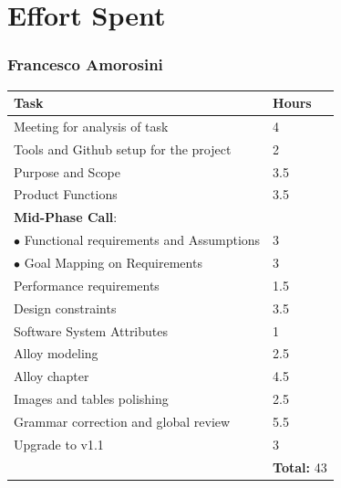 \documentclass{report}
\begin{document}
\chapter{Effort Spent}
\subsection*{Francesco Amorosini}
\begin{table}[!ht]
	\begin{tabular}{|C{.60\textwidth}||C{.20\textwidth}|}
		\toprule
		\textbf{Task} & \textbf{Hours}\\
		\midrule
		\midrule
		Meeting for analysis of task & 4\\
		\midrule
		Tools and Github setup for the project & 2\\
		\midrule
		Purpose and Scope & 3.5\\
		\midrule
		Product Functions& 3.5\\ 
		\midrule
		\small{\textbf{Mid-Phase Call}}: & \\
		\vspace{.2mm}
		$\bullet$ Functional requirements and Assumptions & \vspace{.2mm} 3\\
		$\bullet$ Goal Mapping on Requirements & 3\\
		\midrule
		Performance requirements & 1.5\\
		\midrule
		Design constraints & 3.5\\
		\midrule
		Software System Attributes & 1\\
		\midrule
		Alloy modeling & 2.5\\
		\midrule
		Alloy chapter & 4.5\\
		\midrule
		Images and tables polishing & 2.5\\
		\midrule
		Grammar correction and global review & 5.5\\
		\midrule
		Upgrade to v1.1 & 3\\
		\midrule
		& \textbf{Total:} 43\\
		\bottomrule
	\end{tabular}
\end{table}
\clearpage
\end{document}
